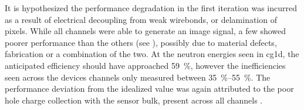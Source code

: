 \documentclass[../../../main.tex]{subfiles}%
\begin{document}
    It is hypothesized the performance degradation in the first iteration was incurred as a result of electrical decoupling from weak wirebonds, or delamination of pixels.
    While all channels were able to generate an image signal, a few showed poorer performance than the others (see ), possibly due to material defects, fabrication or a combination of the two.
    At the neutron energies seen in \gls{cg1d}, the anticipated efficiency should have approached \SI{59}{\percent}, however the inefficiencies seen across the devices channels only measured between \SIrange{35}{55}{\percent}.
    The performance deviation from the idealized value was again attributed to the poor hole charge collection with the sensor bulk, present across all channels \cite{Herrera_2016}.
\end{document}

